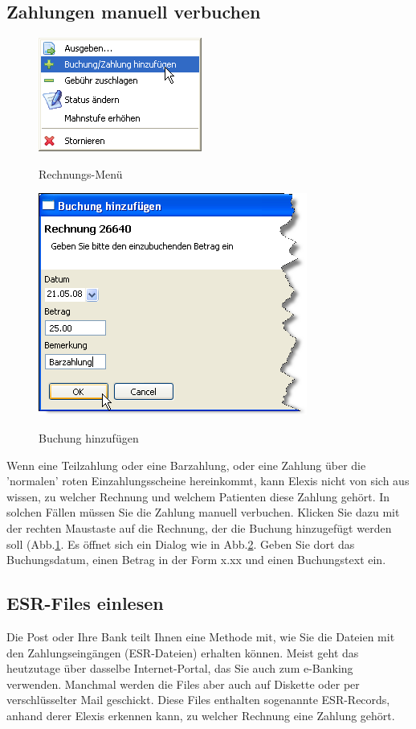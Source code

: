 \documentclass[a4paper]{scrartcl}
\begin{document}
\subsection{Zahlungen manuell verbuchen}
\begin{figure}
  \includegraphics{abr17}\\
  \caption{Rechnungs-Menü}\label{fig:abr17}
\end{figure}
\begin{figure}
  \includegraphics{abr18}\\
  \caption{Buchung hinzufügen}\label{fig:abr18}
\end{figure}

Wenn eine Teilzahlung oder eine Barzahlung, oder eine Zahlung über die 'normalen' roten Einzahlungsscheine hereinkommt, kann Elexis nicht von sich aus wissen, zu welcher Rechnung und welchem Patienten diese Zahlung gehört. In solchen Fällen müssen Sie die Zahlung manuell verbuchen. Klicken Sie dazu mit der rechten Maustaste auf die Rechnung, der die Buchung hinzugefügt werden soll (Abb.\ref{fig:abr17}. Es öffnet sich ein Dialog wie in Abb.\ref{fig:abr18}. Geben Sie dort das Buchungsdatum, einen Betrag in der Form x.xx und einen Buchungstext ein.


\subsection{ESR-Files einlesen}
Die Post oder Ihre Bank teilt Ihnen eine Methode mit, wie Sie die Dateien mit den Zahlungseingängen (ESR-Dateien) erhalten können. Meist geht das heutzutage über dasselbe Internet-Portal, das Sie auch zum e-Banking verwenden. Manchmal werden die Files aber auch auf Diskette oder per verschlüsselter Mail geschickt.
Diese Files enthalten sogenannte ESR-Records, anhand derer Elexis erkennen kann, zu welcher Rechnung eine Zahlung gehört.
\end{document}
